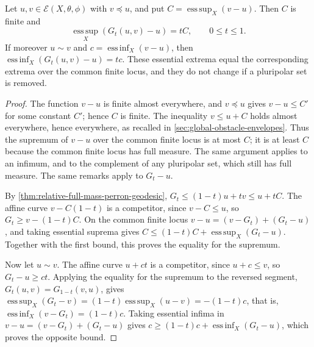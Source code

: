 \begin{proposition}\label{prop:geodesic-extremal-difference-slopes}
Let $u,v\in\mathcal E(X,\theta,\phi)$ with $v\preceq u$, and put $C=\operatorname*{ess\,sup}_X(v-u)$. Then $C$ is finite and
\[
 \operatorname*{ess\,sup}_X(G_t(u,v)-u)=tC,\qquad0\leq t\leq1.
\]
If moreover $u\sim v$ and $c=\operatorname*{ess\,inf}_X(v-u)$, then $\operatorname*{ess\,inf}_X(G_t(u,v)-u)=tc$. These essential extrema equal the corresponding extrema over the common finite locus, and they do not change if a pluripolar set is removed.
\end{proposition}
\begin{proof}
The function $v-u$ is finite almost everywhere, and $v\preceq u$ gives $v-u\leq C'$ for some constant $C'$; hence $C$ is finite. The inequality $v\leq u+C$ holds almost everywhere, hence everywhere, as recalled in \cref{sec:global-obstacle-envelopes}. Thus the supremum of $v-u$ over the common finite locus is at most $C$; it is at least $C$ because the common finite locus has full measure. The same argument applies to an infimum, and to the complement of any pluripolar set, which still has full measure. The same remarks apply to $G_t-u$.

By \cref{thm:relative-full-mass-perron-geodesic}, $G_t\leq(1-t)u+tv\leq u+tC$. The affine curve $v-C(1-t)$ is a competitor, since $v-C\leq u$, so $G_t\geq v-(1-t)C$. On the common finite locus $v-u=(v-G_t)+(G_t-u)$, and taking essential suprema gives $C\leq(1-t)C+\operatorname*{ess\,sup}_X(G_t-u)$. Together with the first bound, this proves the equality for the supremum.

Now let $u\sim v$. The affine curve $u+ct$ is a competitor, since $u+c\leq v$, so $G_t-u\geq ct$. Applying the equality for the supremum to the reversed segment, $G_t(u,v)=G_{1-t}(v,u)$, gives $\operatorname*{ess\,sup}_X(G_t-v)=(1-t)\operatorname*{ess\,sup}_X(u-v)=-(1-t)c$, that is, $\operatorname*{ess\,inf}_X(v-G_t)=(1-t)c$. Taking essential infima in $v-u=(v-G_t)+(G_t-u)$ gives $c\geq(1-t)c+\operatorname*{ess\,inf}_X(G_t-u)$, which proves the opposite bound.
\end{proof}


